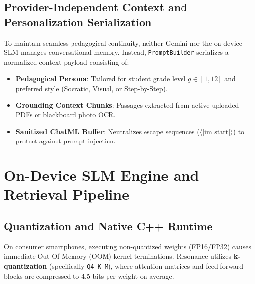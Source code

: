 \documentclass[10.5pt,a4paper]{article}
\begin{document}
\subsection{Provider-Independent Context and Personalization Serialization}
To maintain seamless pedagogical continuity, neither Gemini nor the on-device SLM manages conversational memory. Instead, \texttt{PromptBuilder} serializes a normalized context payload consisting of:
\begin{itemize}[leftmargin=*,itemsep=0.5pt,topsep=1pt]
  \item \textbf{Pedagogical Persona}: Tailored for student grade level $g \in [1, 12]$ and preferred style (Socratic, Visual, or Step-by-Step).
  \item \textbf{Grounding Context Chunks}: Passages extracted from active uploaded PDFs or blackboard photo OCR.
  \item \textbf{Sanitized ChatML Buffer}: Neutralizes escape sequences ($\langle|\text{im\_start}|\rangle$) to protect against prompt injection.
\end{itemize}

\clearpage

\section{On-Device SLM Engine and Retrieval Pipeline}

\subsection{Quantization and Native C++ Runtime}
On consumer smartphones, executing non-quantized weights (FP16/FP32) causes immediate Out-Of-Memory (OOM) kernel terminations. Resonance utilizes \textbf{k-quantization} (specifically \texttt{Q4\_K\_M}), where attention matrices and feed-forward blocks are compressed to 4.5 bits-per-weight on average.
\end{document}
